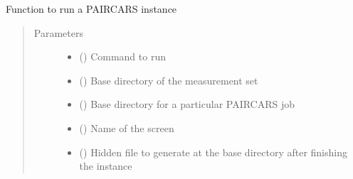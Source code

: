 \documentclass[letterpaper,10pt,english]{sphinxmanual}
\begin{document}
\begin{fulllineitems}
\label{\detokenize{paircars:paircars.basic_func.paircars_instance_runner}}
\sphinxAtStartPar
Function to run a P\sphinxhyphen{}AIRCARS instance
\begin{quote}\begin{description}
\item[{Parameters}] \leavevmode\begin{itemize}
\item {} 
\sphinxAtStartPar
{} () \textendash{} Command to run

\item {} 
\sphinxAtStartPar
{} () \textendash{} Base directory of the measurement set

\item {} 
\sphinxAtStartPar
{} () \textendash{} Base directory for a particular P\sphinxhyphen{}AIRCARS job

\item {} 
\sphinxAtStartPar
{} () \textendash{} Name of the screen

\item {} 
\sphinxAtStartPar
{} () \textendash{} Hidden file to generate at the base directory after finishing the instance

\end{itemize}

\end{description}\end{quote}

\end{fulllineitems}

\end{document}
